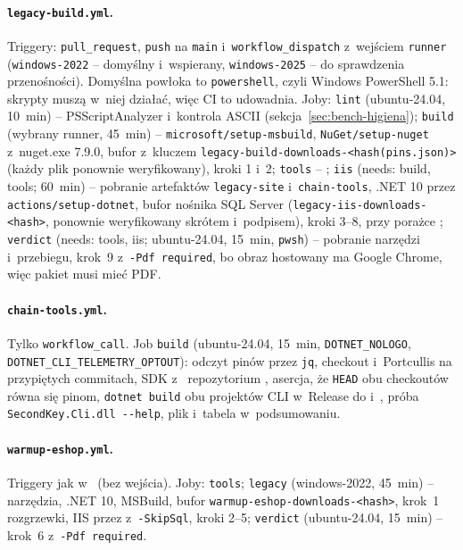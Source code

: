 \paragraph{\texttt{legacy-build.yml}.} Triggery: \texttt{pull\_request}, \texttt{push} na
\texttt{main} i~\texttt{workflow\_dispatch} z~wejściem \texttt{runner}
(\texttt{windows-2022} -- domyślny i~wspierany, \texttt{windows-2025} -- do sprawdzenia
przenośności). Domyślna powłoka to \texttt{powershell}, czyli Windows PowerShell 5.1:
skrypty muszą w~niej działać, więc CI to udowadnia. Joby: \texttt{lint} (ubuntu-24.04,
10~min) -- PSScriptAnalyzer i~kontrola ASCII (sekcja~\ref{sec:bench-higiena});
\texttt{build} (wybrany runner, 45~min) -- \texttt{microsoft/setup-msbuild},
\texttt{NuGet/setup-nuget} z~nuget.exe 7.9.0, bufor  z~kluczem
\texttt{legacy-build-downloads-<hash(pins.json)>} (każdy plik ponownie weryfikowany), kroki
1 i~2; \texttt{tools} -- ; \texttt{iis} (needs: build, tools; 60~min)
-- pobranie artefaktów \texttt{legacy-site} i~\texttt{chain-tools}, .NET 10 przez
\texttt{actions/setup-dotnet}, bufor nośnika SQL Server
(\texttt{legacy-iis-downloads-<hash>}, ponownie weryfikowany skrótem i~podpisem), kroki
3--8, przy porażce ; \texttt{verdict} (needs: tools, iis;
ubuntu-24.04, 15~min, \texttt{pwsh}) -- pobranie narzędzi i~przebiegu, krok~9
z~\texttt{-Pdf required}, bo obraz hostowany ma Google Chrome, więc pakiet musi mieć PDF.

\paragraph{\texttt{chain-tools.yml}.} Tylko \texttt{workflow\_call}. Job \texttt{build}
(ubuntu-24.04, 15~min, \texttt{DOTNET\_NOLOGO}, \texttt{DOTNET\_CLI\_TELEMETRY\_OPTOUT}):
odczyt pinów przez \texttt{jq}, checkout  i~Portcullis na przypiętych
commitach, SDK z~ repozytorium , asercja, że \texttt{HEAD}
obu checkoutów równa się pinom, \texttt{dotnet build} obu projektów CLI w~Release do
 i~, próba
\texttt{SecondKey.Cli.dll -{}-help}, plik  i~tabela w~podsumowaniu.

\paragraph{\texttt{warmup-eshop.yml}.} Triggery jak w~ (bez
wejścia). Joby: \texttt{tools}; \texttt{legacy} (windows-2022, 45~min) -- narzędzia, .NET
10, MSBuild, bufor \texttt{warmup-eshop-downloads-<hash>}, krok~1 rozgrzewki, IIS przez
 z~\texttt{-SkipSql}, kroki 2--5; \texttt{verdict}
(ubuntu-24.04, 15~min) -- krok~6 z~\texttt{-Pdf required}.


